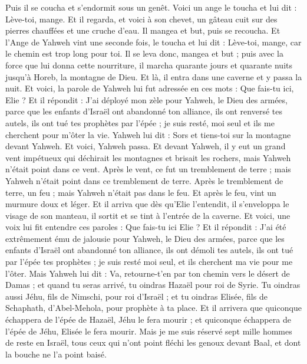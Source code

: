 \begin{multicols}{2}
Puis il se coucha et s'endormit sous un genêt. Voici un ange le toucha et lui dit : Lève-toi, mange.
Et il regarda, et voici à son chevet, un gâteau cuit sur des pierres chauffées et une cruche d'eau. Il mangea et but, puis se recoucha.
Et l'Ange de Yahweh vint une seconde fois, le toucha et lui dit : Lève-toi, mange, car le chemin est trop long pour toi.
Il se leva donc, mangea et but ; puis avec la force que lui donna cette nourriture, il marcha quarante jours et quarante nuits jusqu'à Horeb, la montagne de Dieu.
Et là, il entra dans une caverne et y passa la nuit. Et voici, la parole de Yahweh lui fut adressée en ces mots : Que fais-tu ici, Elie ?
Et il répondit : J'ai déployé mon zèle pour Yahweh, le Dieu des armées, parce que les enfants d'Israël ont abandonné ton alliance, ils ont renversé tes autels, ils ont tué tes prophètes par l'épée ; je suis resté, moi seul et ils me cherchent pour m'ôter la vie.
Yahweh lui dit : Sors et tiens-toi sur la montagne devant Yahweh. Et voici, Yahweh passa. Et devant Yahweh, il y eut un grand vent impétueux qui déchirait les montagnes et brisait les rochers, mais Yahweh n'était point dans ce vent. Après le vent, ce fut un tremblement de terre ; mais Yahweh n'était point dans ce tremblement de terre.
Après le tremblement de terre, un feu ; mais Yahweh n'était pas dans le feu. Et après le feu, vint un murmure doux et léger.
Et il arriva que dès qu'Elie l'entendit, il s'enveloppa le visage de son manteau, il sortit et se tint à l'entrée de la caverne. Et voici, une voix lui fit entendre ces paroles : Que fais-tu ici Elie ?
Et il répondit : J'ai été extrêmement ému de jalousie pour Yahweh, le Dieu des armées, parce que les enfants d'Israël ont abandonné ton alliance, ils ont démoli tes autels, ils ont tué par l'épée tes prophètes ; je suis resté moi seul, et ils cherchent ma vie pour me l'ôter.
Mais Yahweh lui dit : Va, retourne-t'en par ton chemin vers le désert de Damas ; et quand tu seras arrivé, tu oindras Hazaël pour roi de Syrie.
Tu oindras aussi Jéhu, fils de Nimschi, pour roi d'Israël ; et tu oindras Elisée, fils de Schaphath, d'Abel-Mehola, pour prophète à ta place.
Et il arrivera que quiconque échappera de l'épée de Hazaël, Jéhu le fera mourir ; et quiconque échappera de l'épée de Jéhu, Elisée le fera mourir.
Mais je me suis réservé sept mille hommes de reste en Israël, tous ceux qui n'ont point fléchi les genoux devant Baal, et dont la bouche ne l'a point baisé.

\end{multicols}

